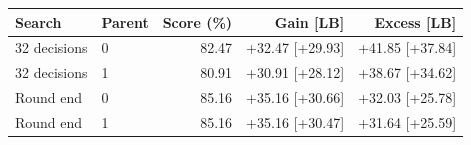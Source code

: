 \begin{tabular}{llrrr}
\toprule
Search & Parent & Score (\%) & Gain [LB] & Excess [LB] \\
\midrule
32 decisions & 0 & 82.47 & +32.47 [+29.93] & +41.85 [+37.84] \\
32 decisions & 1 & 80.91 & +30.91 [+28.12] & +38.67 [+34.62] \\
Round end & 0 & 85.16 & +35.16 [+30.66] & +32.03 [+25.78] \\
Round end & 1 & 85.16 & +35.16 [+30.47] & +31.64 [+25.59] \\
\bottomrule
\end{tabular}
